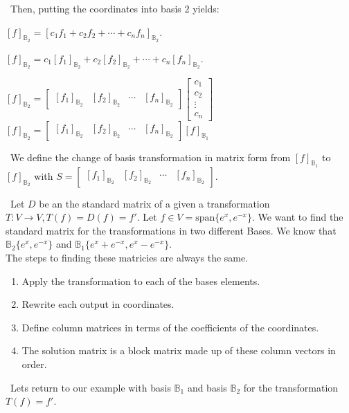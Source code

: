\documentclass[12pt]{article}
\begin{document}
$\,\,\,$Then, putting the coordinates into basis 2 yields:
\begin{center}
$[f]_{\mathbb{B}_2}=[c_1f_1+c_2f_2+\cdots+c_nf_n]_{\mathbb{B}_2}$.

$[f]_{\mathbb{B}_2}=c_1[f_1]_{\mathbb{B}_2}+c_2[f_2]_{\mathbb{B}_2}+\cdots+c_n[f_n]_{\mathbb{B}_2}$.

$[f]_{\mathbb{B}_2}=\begin{bmatrix}[f_1]_{\mathbb{B}_2} & [f_2]_{\mathbb{B}_2} & \cdots & [f_n]_{\mathbb{B}_2}\end{bmatrix}\begin{bmatrix}c_1\\c_2\\\vdots\\c_n\end{bmatrix}$
$[f]_{\mathbb{B}_2}=\begin{bmatrix}[f_1]_{\mathbb{B}_2} & [f_2]_{\mathbb{B}_2} & \cdots & [f_n]_{\mathbb{B}_2}\end{bmatrix}[f]_{\mathbb{B}_1}$
\end{center}

$\,\,\,$We define the change of basis transformation in matrix form from $[f]_{\mathbb{B}_1}$ to $[f]_{\mathbb{B}_2}$ with $S=\begin{bmatrix}[f_1]_{\mathbb{B}_2} & [f_2]_{\mathbb{B}_2} & \cdots & [f_n]_{\mathbb{B}_2}\end{bmatrix}$.

$\,\,\,$Let $D$ be an the standard matrix of a given a transformation $T:V\rightarrow V,T(f)=D(f)=f\prime$. Let $f\in V=\text{span}\lbrace e^x,e^{-x}\rbrace$. We want to find the standard matrix for the transformations in two different Bases. We know that $\mathbb{B}_2\lbrace e^x,e^{-x}\rbrace$ and $\mathbb{B}_1\lbrace e^x+e^{-x},e^x-e^{-x}\rbrace$.\\

The steps to finding these matricies are always the same.
\begin{enumerate}
\item Apply the transformation to each of the bases elements.
\item Rewrite each output in coordinates.
\item Define column matrices in terms of the coefficients of the coordinates.
\item The solution matrix is a block matrix made up of these column vectors in order.
\end{enumerate}

$\,\,\,$Lets return to our example with basis $\mathbb{B}_1$ and basis $\mathbb{B}_2$ for the transformation $T(f)=f\prime$.\\
\end{document}
